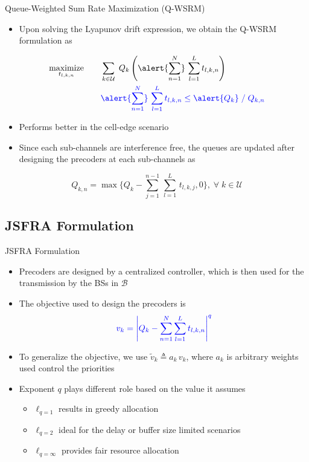 \documentclass[10pt]{beamer}
\newcommand{\me}[1]{\( #1 \)}
\newcommand{\mc}[1]{\mathcal{#1}}
\begin{document}
\begin{frame}{Queue-Weighted Sum Rate Maximization (\acs{Q-WSRM})}
\begin{itemize}
\item Upon solving the Lyapunov drift expression, we obtain the \acs{Q-WSRM} formulation as
\end{itemize}
\begin{subequations}
\begin{align}
 \underset{t_{l,k,n}}{\text{maximize}} & \qquad \sum_{k \in \mc{U}} \; Q_k \left ( \alert{\sum_{n=1}^N} \, \sum_{l = 1}^L  t_{l,k,n} \right ) \\
& \qquad {\color{blue} \alert{\sum_{n=1}^N} \, \sum_{l = 1}^L  t_{l,k,n}  \leq \alert{Q_k} \; / \; Q_{k,n}}
\end{align}
\end{subequations}
\begin{itemize}
\item Performs better in the cell-edge scenario
\item Since each sub-channels are interference free, the queues are updated after designing the precoders at each sub-channels as
\end{itemize}
\begin{equation*}
Q_{k,n} = \max{\Big \lbrace Q_k - \sum_{j = 1}^{n-1} \, \sum_{l = 1}^{L} \, t_{l,k,j} ,0 \Big \rbrace }, \; \forall \; k \in \mathcal{U}
\end{equation*}
\end{frame}

\subsection{\acs{JSFRA} Formulation}

\begin{frame}{\acs{JSFRA} Formulation}
\begin{itemize}
\item Precoders are designed by a centralized controller, which is then used for the transmission by the \acsp{BS} in \me{\mc{B}}
\item The objective used to design the precoders is 
\[ {\color{blue} v_k = \left | Q_k - \sum_{n = 1}^N \sum_{l = 1}^{L} t_{l,k,n} \right |^q } \]
\item To generalize the objective, we use \me{\tilde{v}_k \triangleq a_k \, v_k}, where \me{a_k} is arbitrary weights used control the priorities
\item Exponent \me{q} plays different role based on the value it assumes
	\begin{itemize}
	\item \me{\ell_{q=1}} results in greedy allocation
	\item \me{\ell_{q=2}} ideal for the delay or buffer size limited scenarios
	\item \me{\ell_{q=\infty}} provides fair resource allocation
	\end{itemize}
\end{itemize}
\end{frame}
\end{document}
